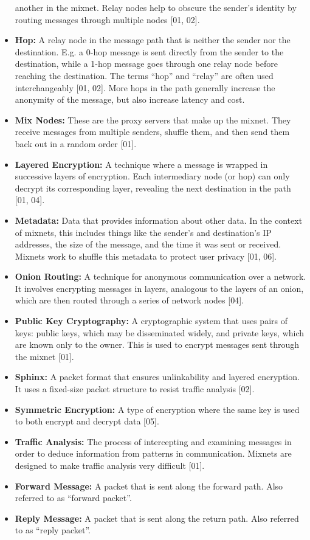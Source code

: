 \begin{itemize}
  another in the mixnet. Relay nodes help to obscure the sender's
  identity by routing messages through multiple nodes {[}01, 02{]}.
\item
  \textbf{Hop:} A relay node in the message path that is neither the
  sender nor the destination. E.g. a 0-hop message is sent directly from
  the sender to the destination, while a 1-hop message goes through one
  relay node before reaching the destination. The terms ``hop'' and
  ``relay'' are often used interchangeably {[}01, 02{]}. More hops in
  the path generally increase the anonymity of the message, but also
  increase latency and cost.
\item
  \textbf{Mix Nodes:} These are the proxy servers that make up the
  mixnet. They receive messages from multiple senders, shuffle them, and
  then send them back out in a random order {[}01{]}.
\item
  \textbf{Layered Encryption:} A technique where a message is wrapped in
  successive layers of encryption. Each intermediary node (or hop) can
  only decrypt its corresponding layer, revealing the next destination
  in the path {[}01, 04{]}.
\item
  \textbf{Metadata:} Data that provides information about other data. In
  the context of mixnets, this includes things like the sender's and
  destination's IP addresses, the size of the message, and the time it
  was sent or received. Mixnets work to shuffle this metadata to protect
  user privacy {[}01, 06{]}.
\item
  \textbf{Onion Routing:} A technique for anonymous communication over a
  network. It involves encrypting messages in layers, analogous to the
  layers of an onion, which are then routed through a series of network
  nodes {[}04{]}.
\item
  \textbf{Public Key Cryptography:} A cryptographic system that uses
  pairs of keys: public keys, which may be disseminated widely, and
  private keys, which are known only to the owner. This is used to
  encrypt messages sent through the mixnet {[}01{]}.
\item
  \textbf{Sphinx:} A packet format that ensures unlinkability and
  layered encryption. It uses a fixed-size packet structure to resist
  traffic analysis {[}02{]}.
\item
  \textbf{Symmetric Encryption:} A type of encryption where the same key
  is used to both encrypt and decrypt data {[}05{]}.
\item
  \textbf{Traffic Analysis:} The process of intercepting and examining
  messages in order to deduce information from patterns in
  communication. Mixnets are designed to make traffic analysis very
  difficult {[}01{]}.
\item
  \textbf{Forward Message:} A packet that is sent along the forward
  path. Also referred to as ``forward packet''.
\item
  \textbf{Reply Message:} A packet that is sent along the return path.
  Also referred to as ``reply packet''.
\end{itemize}

